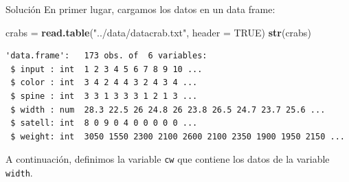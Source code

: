 \documentclass[
  ignorenonframetext,
  aspectratio=169]{beamer}
\newenvironment{Shaded}{\begin{snugshade}}{\end{snugshade}}
\newcommand{\AttributeTok}[1]{\textcolor[rgb]{0.13,0.29,0.53}{#1}}
\newcommand{\ConstantTok}[1]{\textcolor[rgb]{0.56,0.35,0.01}{#1}}
\newcommand{\FunctionTok}[1]{\textcolor[rgb]{0.13,0.29,0.53}{\textbf{#1}}}
\newcommand{\NormalTok}[1]{#1}
\newcommand{\OtherTok}[1]{\textcolor[rgb]{0.56,0.35,0.01}{#1}}
\newcommand{\SpecialCharTok}[1]{\textcolor[rgb]{0.81,0.36,0.00}{\textbf{#1}}}
\newcommand{\StringTok}[1]{\textcolor[rgb]{0.31,0.60,0.02}{#1}}
\begin{document}
\begin{frame}[fragile]{Solución}
\label{soluciuxf3n}
En primer lugar, cargamos los datos en un data frame:

\begin{Shaded}
\begin{Highlighting}[]
\NormalTok{crabs }\OtherTok{=} \FunctionTok{read.table}\NormalTok{(}\StringTok{"../data/datacrab.txt"}\NormalTok{, }\AttributeTok{header =} \ConstantTok{TRUE}\NormalTok{)}
\FunctionTok{str}\NormalTok{(crabs)}
\end{Highlighting}
\end{Shaded}

\begin{verbatim}
'data.frame':   173 obs. of  6 variables:
 $ input : int  1 2 3 4 5 6 7 8 9 10 ...
 $ color : int  3 4 2 4 4 3 2 4 3 4 ...
 $ spine : int  3 3 1 3 3 3 1 2 1 3 ...
 $ width : num  28.3 22.5 26 24.8 26 23.8 26.5 24.7 23.7 25.6 ...
 $ satell: int  8 0 9 0 4 0 0 0 0 0 ...
 $ weight: int  3050 1550 2300 2100 2600 2100 2350 1900 1950 2150 ...
\end{verbatim}

\begin{Shaded}
\end{Shaded}

A continuación, definimos la variable \texttt{cw} que contiene los datos
de la variable \texttt{width}.
\end{frame}
\end{document}

